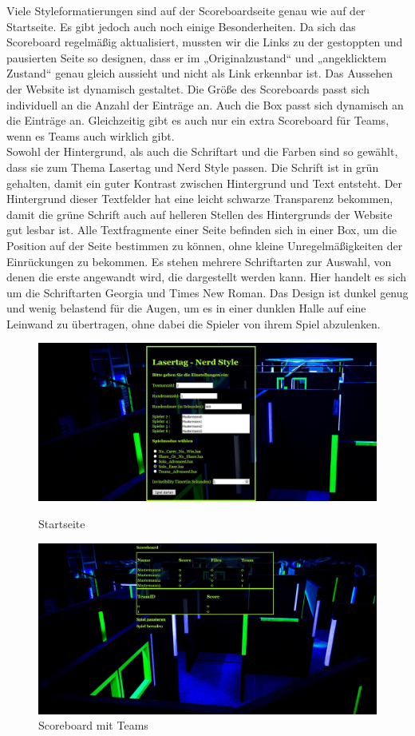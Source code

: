 Viele Styleformatierungen sind auf der Scoreboardseite genau wie auf der Startseite. Es gibt jedoch auch noch einige Besonderheiten. Da sich das Scoreboard regelmäßig aktualisiert, mussten wir die Links zu der gestoppten und pausierten Seite so designen, dass er im „Originalzustand“ und „angeklicktem Zustand“ genau gleich aussieht und nicht als Link erkennbar ist.
Das Aussehen der Website ist dynamisch gestaltet. Die Größe des Scoreboards passt sich individuell an die Anzahl der Einträge an. Auch die Box passt sich dynamisch an die Einträge an. Gleichzeitig gibt es auch nur ein extra Scoreboard für Teams, wenn es Teams auch wirklich gibt.\\ Sowohl der Hintergrund, als auch die Schriftart und die Farben sind so gewählt, dass sie zum Thema Lasertag und Nerd Style passen. 
Die Schrift ist in grün gehalten, damit ein guter Kontrast zwischen Hintergrund und Text entsteht.
Der Hintergrund dieser Textfelder hat eine leicht schwarze Transparenz bekommen, damit die grüne Schrift auch auf helleren Stellen 
des Hintergrunds der Website gut lesbar ist. Alle Textfragmente einer Seite befinden sich in einer Box, um die Position auf der Seite 
bestimmen zu können, ohne kleine Unregelmäßigkeiten der Einrückungen zu bekommen. Es stehen mehrere Schriftarten zur Auswahl, von denen 
die erste angewandt wird, die dargestellt werden kann. Hier handelt es sich um die Schriftarten Georgia und Times New Roman. 
Das Design ist dunkel genug und wenig belastend für die Augen, um es in einer dunklen Halle auf eine Leinwand zu übertragen, ohne dabei die Spieler 
von ihrem Spiel abzulenken. 
\begin{figure}[htb]
	\begin{center}
		\includegraphics[width=0.75 \textwidth]{websitemenue.JPG}
		\caption{Startseite}
		\label{fig:start}
	\end{center}
\begin{center}
	\includegraphics[width=0.75 \textwidth]{scoreboardteams.JPG}
	\caption{Scoreboard mit Teams}
	\label{fig:team}
\end{center}
\end{figure}


